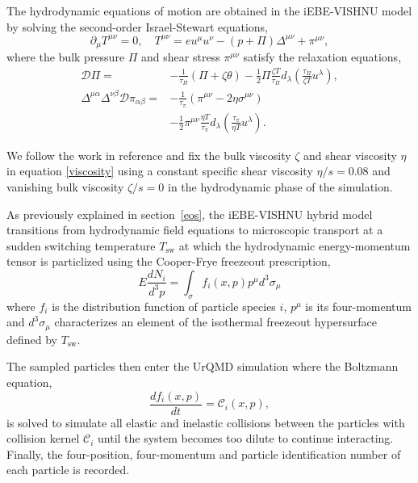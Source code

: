 \documentclass[aps,prc,reprint,amsmath,nofootinbib,superscriptaddress]{revtex4-1}
\begin{document}
The hydrodynamic equations of motion are obtained in the iEBE-VISHNU model by solving the second-order Israel-Stewart equations,
\begin{equation}
 \partial_\mu T^{\mu\nu} = 0, \quad T^{\mu\nu} = e u^\mu u^\nu - (p + \Pi) \Delta^{\mu\nu} + \pi^{\mu\nu},
\end{equation}
where the bulk pressure $\Pi$ and shear stress $\pi^{\mu\nu}$ satisfy the relaxation equations,
\begin{align}
 \label{viscosity}
  \mathcal{D}\Pi = &- \frac{1}{\tau_\Pi}(\Pi + \zeta \theta) - \frac{1}{2} \Pi \frac{\zeta T}{\tau_\Pi}d_\lambda \left(\frac{\tau_\Pi}{\zeta T} u^\lambda \right), \nonumber \\
  \Delta^{\mu\alpha} \Delta^{\nu\beta} \mathcal{D}\pi_{\alpha\beta} = &- \frac{1}{\tau_\pi}(\pi^{\mu\nu} - 2 \eta \sigma^{\mu\nu}) \\
  &- \frac{1}{2} \pi^{\mu\nu} \frac{\eta T}{\tau_\pi} d_\lambda\left(\frac{\tau_\pi}{\eta T} u^\lambda \right ).
\end{align}

We follow the work in reference \cite{Shen:2014sfi} and fix the bulk viscosity $\zeta$ and shear viscosity $\eta$ in equation \eqref{viscosity} using a constant specific shear viscosity $\eta/s=0.08$ 
and vanishing bulk viscosity $\zeta/s=0$ in the hydrodynamic phase of the simulation. 

As previously explained in section \,\ref{eos}, the iEBE-VISHNU hybrid model transitions from hydrodynamic field equations to microscopic transport at a sudden switching temperature $T_\text{sw}$ 
at which the hydrodynamic energy-momentum tensor is particlized using the Cooper-Frye freezeout prescription,
\begin{equation}
 E\frac{dN_i}{d^3p} = \int_\sigma f_i(x,p) p^\mu d^3\sigma_\mu
 \label{cooper-frye}
\end{equation}
where $f_i$ is the distribution function of particle species $i$, $p^\mu$ is its four-momentum and $d^3\sigma_\mu$ characterizes an element of the isothermal freezeout 
hypersurface defined by $T_\text{sw}$.

The sampled particles then enter the UrQMD simulation where the Boltzmann equation, 
\begin{equation}
 \frac{df_i(x,p)}{dt} = \mathcal{C}_i(x,p),
\end{equation}
is solved to simulate all elastic and inelastic collisions between the particles with collision kernel $\mathcal{C}_i$ until the system becomes too dilute to continue interacting. 
Finally, the four-position, four-momentum and particle identification number of each particle is recorded. 
\end{document}

